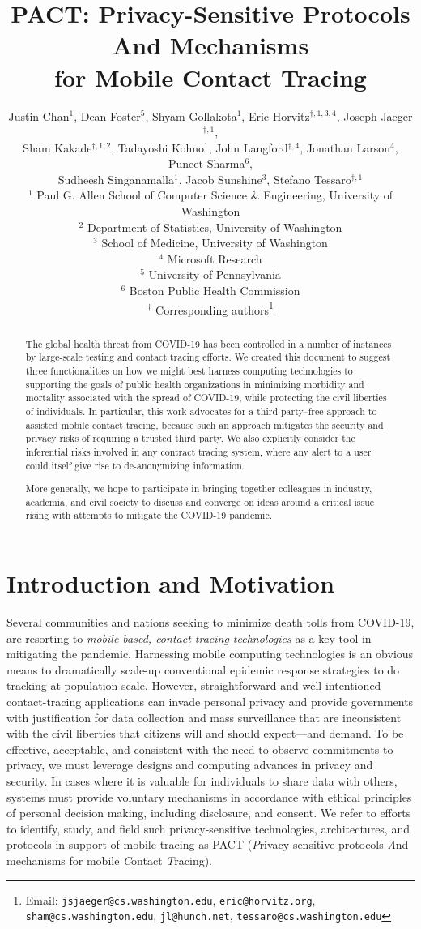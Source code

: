 \documentclass{article}
\title{{\Huge PACT\/}:   {\Huge P\/}rivacy-Sensitive Protocols {\Huge A\/}nd Mechanisms
\\for Mobile {\Huge C\/}ontact {\Huge T\/}racing }
\date{}
\author{
Justin Chan$^{1}$, Dean Foster$^{5}$, Shyam Gollakota$^{1}$, Eric Horvitz$^{\dag,1,3,4}$,  Joseph Jaeger$^{\dag,1}$,\\ 
Sham Kakade$^{\dag,1,2}$, Tadayoshi Kohno$^{1}$, John Langford$^{\dag,4}$, Jonathan Larson$^{4}$, Puneet Sharma$^{6}$,\\   Sudheesh Singanamalla$^{1}$,
Jacob Sunshine$^{3}$, Stefano Tessaro$^{\dag,1}$  
\\
	$^1$ Paul G. Allen School of Computer Science \& Engineering, University of Washington
\\
	$^2$ Department of Statistics, University of Washington
\\
	$^3$ School of Medicine, University of Washington
\\
	$^4$ Microsoft Research
\\
	$^5$ University of Pennsylvania
\\
    $^6$ Boston Public Health Commission
\\
	$^{\dag}$ Corresponding authors\footnote{Email: \texttt{jsjaeger@cs.washington.edu}, \texttt{eric@horvitz.org}, \texttt{sham@cs.washington.edu}, \texttt{jl@hunch.net},
	\texttt{tessaro@cs.washington.edu}
	}
}
\begin{document}
\maketitle


\begin{abstract}
The global health threat from COVID-19 has been controlled in a number of instances by large-scale testing and contact tracing efforts.
We created this document to suggest three functionalities on how we might best harness computing technologies to supporting the goals of public health organizations in minimizing morbidity and mortality associated with the spread of COVID-19, 
while protecting the civil liberties of individuals.
In particular, this work advocates for a third-party--free approach to assisted mobile contact tracing, because such an approach mitigates the security and privacy risks of requiring a trusted third party. We also explicitly consider the inferential risks involved in any contract tracing system, where any alert to a user could itself give rise to de-anonymizing information.  

More generally, we hope to participate in bringing together colleagues in industry, academia, and civil society to discuss and converge on ideas around a critical issue rising with attempts to mitigate the COVID-19 pandemic.
\end{abstract}


\section{Introduction and Motivation}

Several communities and nations seeking to minimize death tolls from COVID-19, are resorting to \emph{mobile-based, contact tracing technologies} as a key tool in mitigating the pandemic. Harnessing mobile computing technologies is an obvious means to dramatically scale-up conventional epidemic response strategies to do tracking at population scale. However, straightforward and well-intentioned contact-tracing applications can invade personal privacy and provide governments with justification for data collection and mass surveillance that are inconsistent with the civil liberties that citizens will and should expect---and demand. To be effective, acceptable, and consistent with the need to observe commitments to privacy, we must leverage designs and computing advances in privacy and security. In cases where it is valuable for individuals to share data with others, systems must provide voluntary mechanisms in accordance with ethical principles of personal decision making, including disclosure, and consent. We refer to efforts to identify, study, and field such privacy-sensitive technologies, architectures, and protocols in support of mobile tracing as PACT (\emph{P}rivacy sensitive protocols \emph{A}nd mechanisms for mobile \emph{C}ontact \emph{T}racing).
\end{document}
